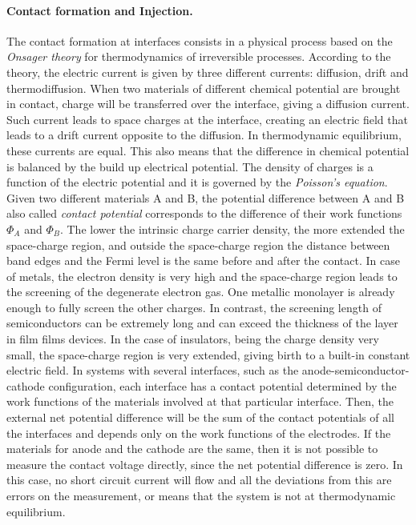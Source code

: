 \documentclass  [
  paper    = a4,
  BCOR     = 10mm,
  twoside,
  fontsize = 12pt,
  fleqn,
  toc      = bibnumbered,
  toc      = listofnumbered,
  numbers  = noendperiod,
  headings = normal,
  listof   = leveldown,
  version  = 3.03
]                                       {scrreprt}
\begin{document}
\paragraph{Contact formation and Injection.} The contact formation at interfaces consists in a physical process based on the \emph{Onsager theory} for thermodynamics of irreversible processes. According to the theory, the electric current is given by three different currents: diffusion, drift and thermodiffusion. When two materials of different chemical potential are brought in contact, charge will be transferred over the interface, giving a diffusion current. Such current leads to space charges at the interface, creating an electric field that leads to a drift current opposite to the diffusion. In thermodynamic equilibrium, these currents are equal. This also means that the difference in chemical potential is balanced by the build up electrical potential. The density of charges is a function of the electric potential and it is governed by the \emph{Poisson's equation}. Given two different materials A and B, the potential difference between A and B also called \emph{contact potential} corresponds to the difference of their work functions $\Phi_A$ and $\Phi_B$. The lower the intrinsic charge carrier density, the more extended the space-charge region, and outside the space-charge region the distance between band edges and the Fermi level is the same before and after the contact. In case of metals, the electron density is very high and the space-charge region leads to the screening of the degenerate electron gas. One metallic monolayer is already enough to fully screen the other charges. In contrast, the screening length of semiconductors can be extremely long and can exceed the thickness of the layer in film films devices. In the case of insulators, being the charge density very small, the space-charge region is very extended, giving birth to a built-in constant electric field. In systems with several interfaces, such as the anode-semiconductor-cathode configuration, each interface has a contact potential determined by the work functions of the materials involved at that particular interface. Then, the external net potential difference will be the sum of the contact potentials of all the interfaces and depends only on the work functions of the electrodes. If the materials for anode and the cathode are the same, then it is not possible to measure the contact voltage directly, since the net potential difference is zero. In this case, no short circuit current will flow and all the deviations from this are errors on the measurement, or means that the system is not at thermodynamic equilibrium.\\
\end{document}
